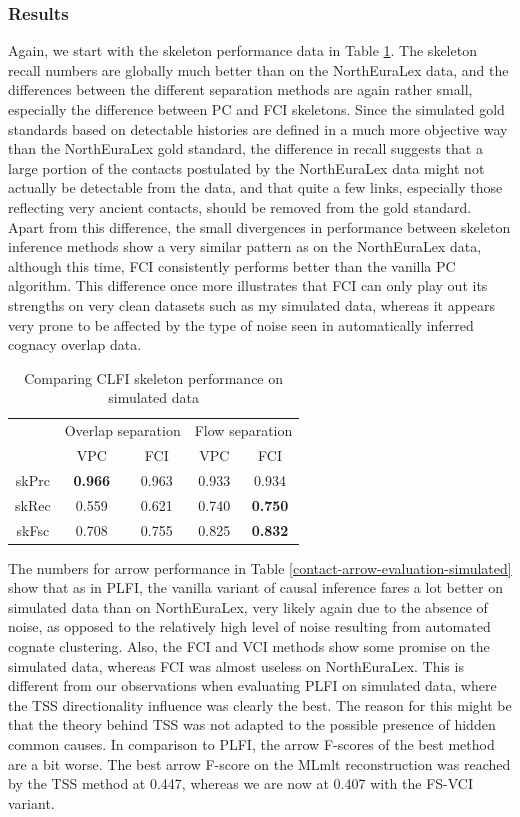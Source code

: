 \subsubsection{Results}
Again, we start with the skeleton performance data in Table \ref{contact-skeleton-evaluation-simulated}. The skeleton recall numbers are globally much better than on the NorthEuraLex data, and the differences between the different separation methods are again rather small, especially the difference between PC and FCI skeletons. Since the simulated gold standards based on detectable histories are defined in a much more objective way than the NorthEuraLex gold standard, the difference in recall suggests that a large portion of the contacts postulated by the NorthEuraLex data might not actually be detectable from the data, and that quite a few links, especially those reflecting very ancient contacts, should be removed from the gold standard. Apart from this difference, the small divergences in performance between skeleton inference methods show a very similar pattern as on the NorthEuraLex data, although this time, FCI consistently performs better than the vanilla PC algorithm. This difference once more illustrates that FCI can only play out its strengths on very clean datasets such as my simulated data, whereas it appears very prone to be affected by the type of noise seen in automatically inferred cognacy overlap data.

\begin{table}
 \centering
 \begin{tabular}{ccccc}
 \hline \hline
   & \multicolumn{2}{l}{Overlap separation} & \multicolumn{2}{l}{Flow separation}\\ 
   & VPC & FCI & VPC & FCI\\ 
 \hline
  skPrc & \textbf{0.966} & 0.963 & 0.933 & 0.934\\
  skRec & 0.559 & 0.621 & 0.740 & \textbf{0.750}\\
  skFsc & 0.708 & 0.755 & 0.825 & \textbf{0.832}\\
  \hline
 \end{tabular}
 \caption{Comparing CLFI skeleton performance on simulated data}
 \label{contact-skeleton-evaluation-simulated}
\end{table}

The numbers for arrow performance in Table \ref{contact-arrow-evaluation-simulated} show that as in PLFI, the vanilla variant of causal inference fares a lot better on simulated data than on NorthEuraLex, very likely again due to the absence of noise, as opposed to the relatively high level of noise resulting from automated cognate clustering. Also, the FCI and VCI methods show some promise on the simulated data, whereas FCI was almost useless on NorthEuraLex. This is different from our observations when evaluating PLFI on simulated data, where the TSS directionality influence was clearly the best. The reason for this might be that the theory behind TSS was not adapted to the possible presence of hidden common causes. In comparison to PLFI, the arrow F-scores of the best method are a bit worse. The best arrow F-score on the MLmlt reconstruction was reached by the TSS method at 0.447, whereas we are now at 0.407 with the FS-VCI variant.


